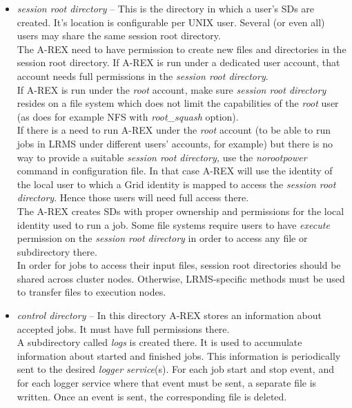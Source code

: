 \documentclass{article}                            %
\begin{document}
\begin{itemize}
\item \textit{session root directory} -- This is the directory in which a
user's SDs are created. It's location is configurable per UNIX user.
Several (or even all) users may share the same session root directory.\\
The A-REX need to have permission to create new files and directories
in the session root directory. If A-REX is run under a dedicated user
account, that account needs full permissions in the \textit{session
root directory}.\\
If A-REX is run under the \emph{root} account, make sure \textit{session
root directory} resides on a file system which does not limit the
capabilities of the \emph{root} user (as does for example NFS with
\emph{root\_squash} option).\\
If there is a need to run A-REX under the \emph{root} account (to
be able to run jobs in LRMS under different users' accounts, for example)
but there is no way to provide a suitable \textit{session root directory,}
use the \emph{norootpower} command in configuration file. In that
case A-REX will use the identity of the local user to which a Grid
identity is mapped to access the \textit{session root directory}.
Hence those users will need full access there.\\
The A-REX creates SDs with proper ownership and permissions for the
local identity used to run a job. Some file systems require users
to have \emph{execute} permission on the \textit{session root directory}
in order to access any file or subdirectory there.\\
In order for jobs to access their input files, session root directories
should be shared across cluster nodes. Otherwise, LRMS-specific methods
must be used to transfer files to execution nodes. 
\end{itemize}

\begin{itemize}
\item \textit{control directory} -- In this directory A-REX stores an information
about accepted jobs. It must have full permissions there.\\
A subdirectory called \textit{logs} is created there. It is used to
accumulate information about started and finished jobs. This information
is periodically sent to the desired \emph{logger service}(s). For
each job start and stop event, and for each logger service where that
event must be sent, a separate file is written. Once an event is sent,
the corresponding file is deleted.
\end{itemize}
\end{document}
